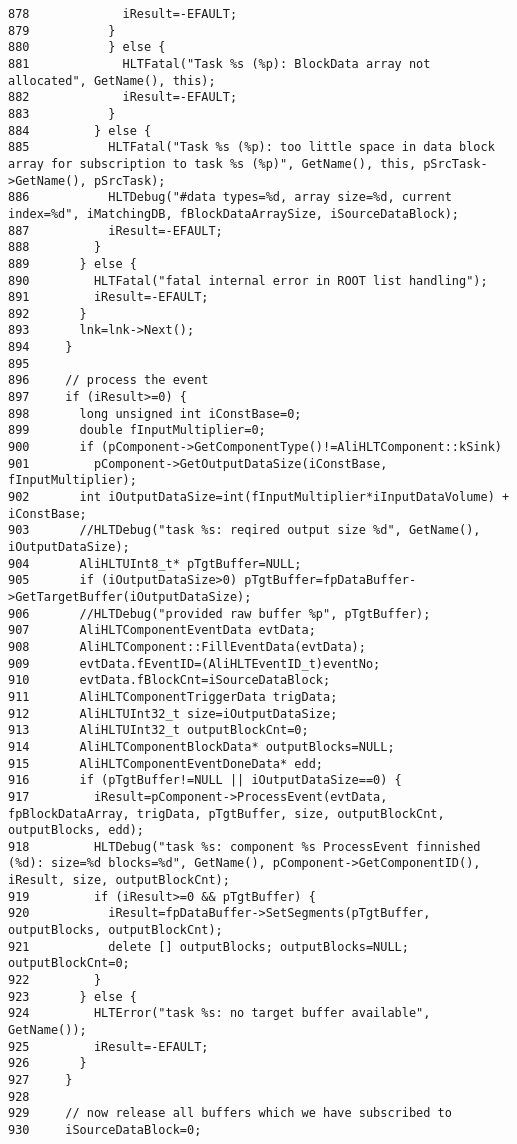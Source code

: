 \begin{verbatim}
878             iResult=-EFAULT;
879           }
880           } else {
881             HLTFatal("Task %s (%p): BlockData array not allocated", GetName(), this);
882             iResult=-EFAULT;
883           }
884         } else {
885           HLTFatal("Task %s (%p): too little space in data block array for subscription to task %s (%p)", GetName(), this, pSrcTask->GetName(), pSrcTask);
886           HLTDebug("#data types=%d, array size=%d, current index=%d", iMatchingDB, fBlockDataArraySize, iSourceDataBlock);
887           iResult=-EFAULT;
888         }
889       } else {
890         HLTFatal("fatal internal error in ROOT list handling");
891         iResult=-EFAULT;
892       }
893       lnk=lnk->Next();
894     }
895 
896     // process the event
897     if (iResult>=0) {
898       long unsigned int iConstBase=0;
899       double fInputMultiplier=0;
900       if (pComponent->GetComponentType()!=AliHLTComponent::kSink)
901         pComponent->GetOutputDataSize(iConstBase, fInputMultiplier);
902       int iOutputDataSize=int(fInputMultiplier*iInputDataVolume) + iConstBase;
903       //HLTDebug("task %s: reqired output size %d", GetName(), iOutputDataSize);
904       AliHLTUInt8_t* pTgtBuffer=NULL;
905       if (iOutputDataSize>0) pTgtBuffer=fpDataBuffer->GetTargetBuffer(iOutputDataSize);
906       //HLTDebug("provided raw buffer %p", pTgtBuffer);
907       AliHLTComponentEventData evtData;
908       AliHLTComponent::FillEventData(evtData);
909       evtData.fEventID=(AliHLTEventID_t)eventNo;
910       evtData.fBlockCnt=iSourceDataBlock;
911       AliHLTComponentTriggerData trigData;
912       AliHLTUInt32_t size=iOutputDataSize;
913       AliHLTUInt32_t outputBlockCnt=0;
914       AliHLTComponentBlockData* outputBlocks=NULL;
915       AliHLTComponentEventDoneData* edd;
916       if (pTgtBuffer!=NULL || iOutputDataSize==0) {
917         iResult=pComponent->ProcessEvent(evtData, fpBlockDataArray, trigData, pTgtBuffer, size, outputBlockCnt, outputBlocks, edd);
918         HLTDebug("task %s: component %s ProcessEvent finnished (%d): size=%d blocks=%d", GetName(), pComponent->GetComponentID(), iResult, size, outputBlockCnt);
919         if (iResult>=0 && pTgtBuffer) {
920           iResult=fpDataBuffer->SetSegments(pTgtBuffer, outputBlocks, outputBlockCnt);
921           delete [] outputBlocks; outputBlocks=NULL; outputBlockCnt=0;
922         }
923       } else {
924         HLTError("task %s: no target buffer available", GetName());
925         iResult=-EFAULT;
926       }
927     }
928 
929     // now release all buffers which we have subscribed to
930     iSourceDataBlock=0;

\end{verbatim}
